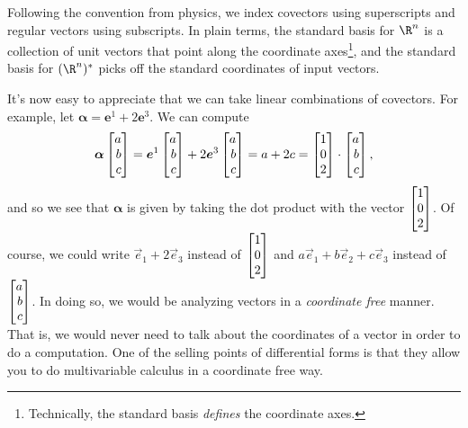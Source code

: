 Following the convention from physics, we index covectors using superscripts
and regular vectors using subscripts.  In plain terms, the standard basis for
$\R^n$ is a collection of unit vectors that point along the coordinate axes\footnote{
Technically, the standard basis \emph{defines} the coordinate axes.}, and the
standard basis for $(\R^n)^*$ picks off the standard coordinates of input
vectors.

It's now easy to appreciate that we can take linear combinations of covectors.
For example, let $\bm \alpha = \bm e^1+2\bm e^3$.  We can compute
\[
	\bm \alpha\mat{a\\b\\c} = \bm e^1\mat{a\\b\\c}
	+2\bm e^3\mat{a\\b\\c} = a+2c = \mat{1\\0\\2}\cdot \mat{a\\b\\c},
\]
and so we see that $\bm\alpha$ is given by taking the dot product with
the vector $\mat{1\\0\\2}$.  Of course, we could write $\vec e_1+2\vec e_3$
instead of $\mat{1\\0\\2}$ and $a\vec e_1+b\vec e_2+c\vec e_3$ instead of 
$\mat{a\\b\\c}$.  In doing so, we would be analyzing vectors in
a \emph{coordinate free} manner.  That is, we would never need to talk about
the coordinates of a vector in order to do a computation.  One of the selling points
of differential forms is that they allow you to do multivariable calculus
in a coordinate free way.

